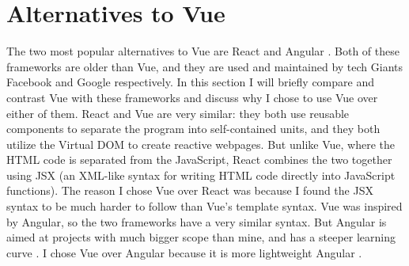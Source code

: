 \section{Alternatives to Vue}
\hspace{-0.25in}The two most popular alternatives to Vue are React and Angular 
\cite{angular-react-vue}. 
Both of these frameworks are older than Vue, and they are used and maintained by 
tech Giants Facebook and Google respectively. 
In this section I will briefly compare and contrast Vue with these frameworks and 
discuss why I chose to use Vue over either of them. 
\newline\newline
React and Vue are very similar: 
they both use reusable components to separate the program into self-contained units,
and they both utilize the Virtual DOM to create reactive webpages. 
But unlike Vue, where the HTML code is separated from the JavaScript,
React combines the two together using JSX
(an XML-like syntax for writing HTML code directly into JavaScript functions). 
The reason I chose Vue over React was because I found the JSX syntax to be 
much harder to follow than Vue's template syntax.
\newline\newline
Vue was inspired by Angular, so the two frameworks have a very similar syntax.
But Angular is aimed at projects with much bigger scope than mine, 
and has a steeper learning curve \cite{angular-react-vue}.
I chose Vue over Angular because it is more lightweight Angular \cite{vue-comparison}.

